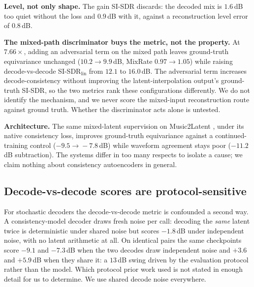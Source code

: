 \documentclass[conference]{IEEEtran}
\begin{document}
\textbf{Level, not only shape.} The gain SI-SDR discards: the decoded mix is
$1.6$\,dB too quiet without the loss and $0.9$\,dB with it, against a
reconstruction level error of $0.8$\,dB.

\textbf{The mixed-path discriminator buys the metric, not the property.} At
$7.66\times$, adding an adversarial term on the mixed path leaves ground-truth
equivariance unchanged ($10.2\!\to\!9.9$\,dB, MixRate $0.97\!\to\!1.05$) while
raising decode-vs-decode SI-SDR$_\mathrm{lin}$ from $12.1$ to $16.0$\,dB. The adversarial term increases decode-consistency without improving the
latent-interpolation output's ground-truth SI-SDR, so the two metrics rank
these configurations differently. We do not identify the mechanism, and we never score the mixed-input
reconstruction route against ground truth. Whether the discriminator acts alone is untested.

\textbf{Architecture.} The same mixed-latent supervision on Music2Latent
\cite{pasini2024music2latent}, under its native consistency loss, improves
ground-truth equivariance against a continued-training control
($-9.5\!\to\!-7.8$\,dB) while waveform agreement stays poor ($-11.2$\,dB
subtraction). The systems differ in too many respects to isolate a cause; we
claim nothing about consistency autoencoders in general.

\subsection{Decode-vs-decode scores are protocol-sensitive}\label{sec:protocol}
For stochastic decoders the decode-vs-decode metric is confounded a second
way. A consistency-model decoder \cite{pasini2024music2latent} draws fresh noise per call: decoding the \emph{same} latent twice is
deterministic under shared noise but scores $-1.8$\,dB under independent
noise, with no latent arithmetic at all. On identical pairs the same checkpoints score $-9.1$ and $-7.3$\,dB
when the two decodes draw independent noise and $+3.6$ and $+5.9$\,dB when
they share it: a $13$\,dB swing driven by the evaluation protocol rather
than the model. Which protocol prior work used is not stated in enough
detail for us to determine. We use shared decode noise
everywhere.
\end{document}
